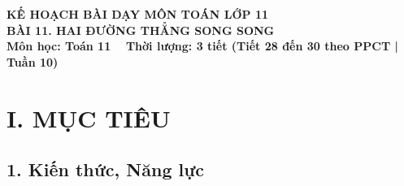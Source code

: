 \documentclass[12pt, a4paper]{article}
\begin{document}
\begin{center}
    {\fontsize{14pt}{17pt}\selectfont \textbf{KẾ HOẠCH BÀI DẠY MÔN TOÁN LỚP 11}}\\[6pt]
    {\fontsize{16pt}{19pt}\selectfont \textbf{BÀI 11. HAI ĐƯỜNG THẲNG SONG SONG}}\\[4pt]
    {\fontsize{12pt}{15pt}\selectfont \textbf{Môn học: Toán 11} \ \textbar \ \textbf{Thời lượng: 3 tiết (Tiết 28 đến 30 theo PPCT | Tuần 10)}}
\end{center}

\vspace{5pt}

\section*{I. MỤC TIÊU}

\subsection*{1. Kiến thức, Năng lực}
\end{document}
